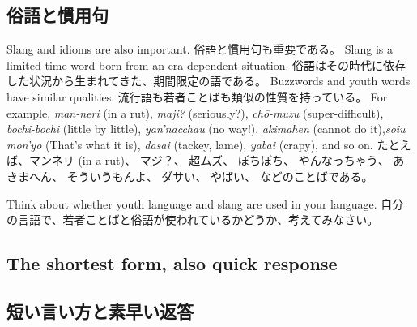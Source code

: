 \documentclass[uplatex,dvipdfmx,b5paper,english,10pt]{jsbook}
\begin{document}
\subsection{俗語と慣用句}
\fi

\ifEnglish
Slang and idioms are also important.
\else
俗語と慣用句も重要である。
\fi
\ifEnglish
Slang is a limited-time word born from an era-dependent situation.
\else
俗語はその時代に依存した状況から生まれてきた、期間限定の語である。
\fi
\ifEnglish
Buzzwords and youth words have similar qualities.
\else
流行語も若者ことばも類似の性質を持っている。
\fi
\ifEnglish
For example, {\it man-neri\/} (in a rut), {\it maji?\/} (seriously?), {\it ch\=o-muzu\/} (super-difficult), {\it bochi-bochi\/} (little by little), {\it yan'nacchau\/} (no way!), {\it akimahen\/} (cannot do it),{\it s\-oiu mon'yo\/} (That's what it is), {\it dasai\/} (tackey, lame), {\it yabai\/} (crapy), and so on.
\else
たとえば、マンネリ (in a rut)、 マジ？、 超ムズ、 ぼちぼち、 やんなっちゃう、 あきまへん、 そういうもんよ、 ダサい、 やばい、 などのことばである。
\fi

\begin{toiquestion}
\ifEnglish
Think about whether youth language and slang are used in your language.
\else
自分の言語で、若者ことばと俗語が使われているかどうか、考えてみなさい。
\fi
\end{toiquestion}

\ifEnglish
\subsection{The shortest form, also quick response}
\else
\subsection{短い言い方と素早い返答}
\fi
\end{document}
